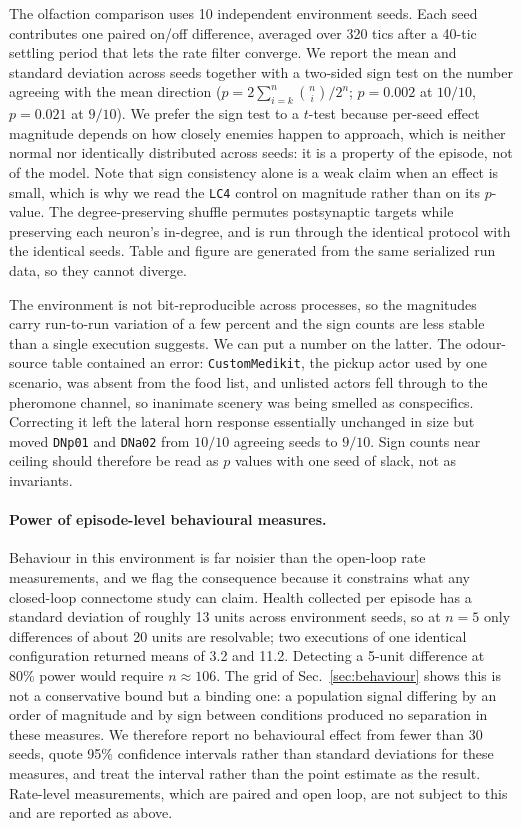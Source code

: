 \documentclass[10pt,twoside]{article}
\newcommand{\cell}[1]{\texttt{#1}}
\begin{document}
The olfaction comparison uses 10 independent
environment seeds. Each seed contributes one paired on/off difference, averaged
over 320 tics after a 40-tic settling period that lets the rate filter
converge. We report the mean and standard deviation across seeds together with
a two-sided sign test on the number agreeing with the mean direction
($p=2\sum_{i=k}^{n}\binom{n}{i}/2^{n}$; $p=0.002$ at $10/10$, $p=0.021$ at
$9/10$). We prefer the
sign test to a $t$-test because per-seed effect magnitude depends on how
closely enemies happen to approach, which is neither normal nor
identically distributed across seeds: it is a property of the episode, not
of the model. Note that sign consistency alone is a weak claim when an effect
is small, which is why we read the \cell{LC4} control on magnitude rather than
on its $p$-value. The degree-preserving shuffle permutes postsynaptic targets
while preserving each neuron's in-degree, and is run through the identical
protocol with the identical seeds. Table and figure are generated from the same
serialized run data, so they cannot diverge.

The environment is not bit-reproducible across processes, so the magnitudes
carry run-to-run variation of a few percent and the sign counts are less stable
than a single execution suggests. We can put a number on the latter. The odour-source table contained an error:
\texttt{CustomMedikit}, the pickup actor used by one scenario, was absent from
the food list, and unlisted actors fell through to the pheromone channel, so
inanimate scenery was being smelled as conspecifics. Correcting it left the
lateral horn response essentially unchanged in size but moved \cell{DNp01} and
\cell{DNa02} from $10/10$ agreeing seeds to $9/10$. Sign counts near ceiling should therefore be read as $p$ values with
one seed of slack, not as invariants.

\paragraph{Power of episode-level behavioural measures.} Behaviour in this
environment is far noisier than the open-loop rate measurements, and we flag
the consequence because it constrains what any closed-loop connectome study can
claim. Health collected per episode has a standard deviation of roughly 13
units across environment seeds, so at $n=5$ only differences of about 20 units
are resolvable; two executions of one identical configuration returned means of
3.2 and 11.2. Detecting a 5-unit difference at 80\% power would require
$n\approx106$. The grid of Sec.~\ref{sec:behaviour} shows this is not a conservative
bound but a binding one: a population signal differing by an order of
magnitude and by sign between conditions produced no separation in these
measures. We therefore report no behavioural effect from fewer than 30
seeds, quote 95\% confidence intervals rather than standard deviations for
these measures, and treat the interval rather than the point estimate as the
result. Rate-level measurements, which are paired and open loop, are not
subject to this and are reported as above.
\end{document}
